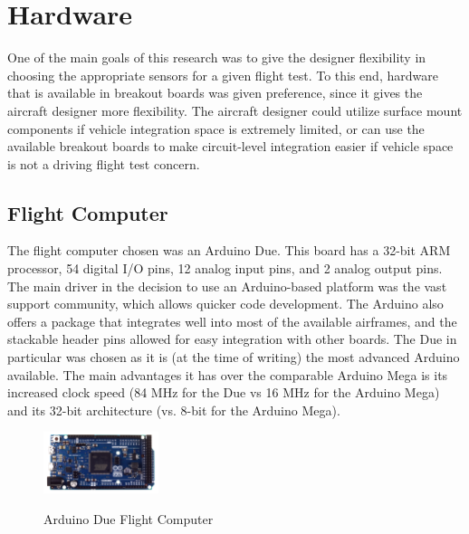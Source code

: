 \section{Hardware}
\label{hardware}
One of the main goals of this research was to give the designer flexibility in choosing the appropriate sensors for a given flight test. To this end, hardware that is available in breakout boards was given preference, since it gives the aircraft designer more flexibility. The aircraft designer could utilize surface mount components if vehicle integration space is extremely limited, or can use the available breakout boards to make circuit-level integration easier if vehicle space is not a driving flight test concern.
\subsection*{Flight Computer}
The flight computer chosen was an Arduino Due. This board has a 32-bit ARM processor, 54 digital I/O pins, 12 analog input pins, and 2 analog output pins. The main driver in the decision to use an Arduino-based platform was the vast support community, which allows quicker code development. The Arduino also offers a package that integrates well into most of the available airframes, and the stackable header pins allowed for easy integration with other boards. The Due in particular was chosen as it is (at the time of writing) the most advanced Arduino available. The main advantages it has over the comparable Arduino Mega is its increased clock speed (84 MHz for the Due\cite{Atmel2012} vs 16 MHz for the Arduino Mega\cite{Atmel2012atmega}) and its 32-bit architecture (vs. 8-bit for the Arduino Mega).
\begin{figure}[H]

  \centering
    \includegraphics[width=0.3\textwidth]{figures/arduinoDue.jpg}\  \caption{Arduino Due Flight Computer} \label{arduinoPicture}
\end{figure}

